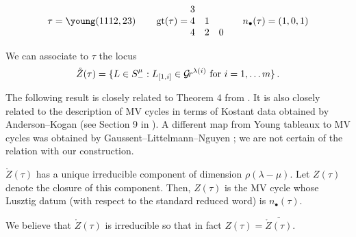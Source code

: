 \documentclass{article} %
\begin{document}
    \[
        \tau = \young(1112,23) \qquad \gt(\tau) = \begin{matrix}
            3 \\
            4 & 1 \\ 
            4 & 2 & 0 
        \end{matrix} \qquad n_\bullet(\tau) = (1,0,1) %
    \]
% 
% 


We can associate to $\tau$ the locus 
%  
\begin{equation*}
    \mathring Z(\tau) = 
        \{
            L\in S^\mu_- : L_{[1,i]} \in\mathcal{G}\!r^{\lambda(i)}\text{ for } i = 1, \dots m 
        \}\,. 
\end{equation*}
% 

The following result is closely related to Theorem 4 from \cite{dranowski2020generalized}.  It is also closely related to the description of MV cycles in terms of Kostant data obtained by Anderson--Kogan \cite{anderson2004mirkovic} (see Section 9 in \cite{kamnitzer2010mirkovic}).  A different map from Young tableaux to MV cycles was obtained by Gaussent--Littelmann--Nguyen \cite[Theorem 2]{gaussent2013knuth}; we are not certain of the relation with our construction. 

\begin{proposition}
    \label{pr:newmvdes}
    $ \mathring Z(\tau)$ has a unique irreducible component of dimension $ \rho(\lambda - \mu)$.  Let $ Z(\tau)$ denote the closure of this component.  Then, 
    $Z(\tau)$ is the MV cycle whose Lusztig datum (with respect to the standard reduced word) is $n_\bullet(\tau)$. 
\end{proposition}
\begin{remark}
We believe that $ \mathring Z(\tau)$ is irreducible so that in fact $ Z(\tau) = \overline{ \mathring Z(\tau)}$.
\end{remark}
\end{document}
